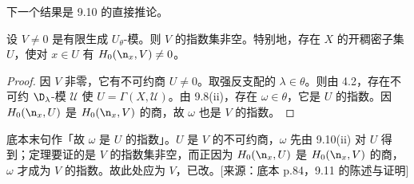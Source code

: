 下一个结果是 9.10 的直接推论。

\begin{theorem}\label{thm:03.9.11}
设 $V\ne 0$ 是有限生成 $U_\theta$-模。则 $V$ 的指数集非空。特别地，存在 $X$ 的开稠密子集 $U$，使对 $x\in U$ 有 $H_0(\n_x,V)\ne 0$。
\end{theorem}

\begin{proof}
因 $V$ 非零，它有不可约商 $U\ne 0$。取强反支配的 $\lambda\in\theta$。则由 4.2，存在不可约 $\D_\lambda$-模 $\mathcal{U}$ 使 $U=\Gamma(X,\mathcal{U})$。由 9.8(ii)，存在 $\omega\in\theta$，它是 $U$ 的指数。因 $H_0(\n_x,U)$ 是 $H_0(\n_x,V)$ 的商，故 $\omega$ 也是 $V$ 的指数。
\end{proof}

\begin{annote}
底本末句作「故 $\omega$ 是 $U$ 的指数」。$U$ 是 $V$ 的不可约商，$\omega$ 先由 9.10(ii) 对 $U$ 得到；定理要证的是 $V$ 的指数集非空，而正因为 $H_0(\n_x,U)$ 是 $H_0(\n_x,V)$ 的商，$\omega$ 才成为 $V$ 的指数。故此处应为 $V$，已改。[来源：底本 p.84，9.11 的陈述与证明]
\end{annote}
